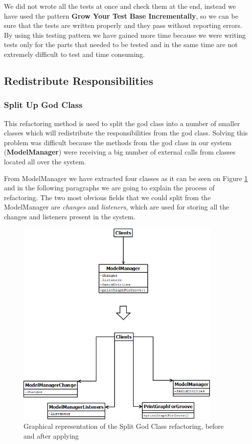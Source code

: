 \documentclass[a4paper]{article}
\begin{document}
We did not wrote all the tests at once and check them at the end, instead we have used the pattern \textbf{Grow Your Test Base Incrementally}, so we can be sure that the tests are written properly and they pass without reporting errors. By using this testing pattern we have gained more time because we were writing tests only for the parts that needed to be tested and in the same time are not extremely difficult to test and time consuming.

\subsection{Redistribute Responsibilities}

\subsubsection{Split Up God Class}
This refactoring method is used to split the god class into a number of smaller classes which will redistribute the responsibilities from the god class. Solving this problem was difficult because the methods from the god class in our system (\textbf{ModelManager}) were receiving a big number of external calls from classes located all over the system.

From ModelManager we have extracted four classes as it can be seen on Figure \ref{fig:GodClassSplit} and in the following paragraphs we are going to explain the process of refactoring. The two most obvious fields that we could split from the ModelManager are \emph{changes} and \emph{listeners}, which are used for storing all the changes and listeners present in the system.

\begin{figure}[h]
\centering
\includegraphics[width=0.9\textwidth]{Images/GodClassSplit}
\caption{Graphical representation of the Split God Class refactoring, before and after applying}
\label{fig:GodClassSplit}
\end{figure}
\end{document}
